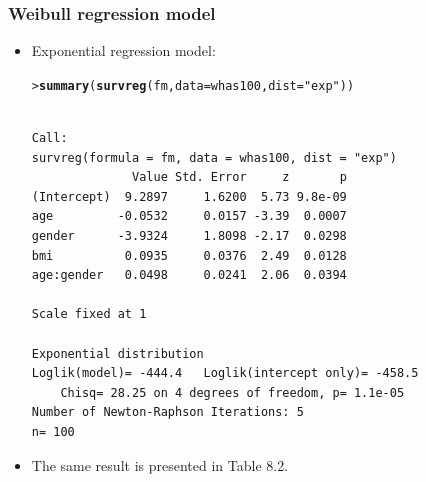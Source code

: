\documentclass[10pt]{beamer}\usepackage[]{graphicx}\usepackage[]{color}
\makeatletter
\newcommand{\hlstr}[1]{\textcolor[rgb]{0.192,0.494,0.8}{#1}}%
\newcommand{\hlstd}[1]{\textcolor[rgb]{0.345,0.345,0.345}{#1}}%
\newcommand{\hlkwc}[1]{\textcolor[rgb]{0.333,0.667,0.333}{#1}}%
\newcommand{\hlkwd}[1]{\textcolor[rgb]{0.737,0.353,0.396}{\textbf{#1}}}%
\newenvironment{kframe}{%
 \def\at@end@of@kframe{}%
 \ifinner\ifhmode%
  \def\at@end@of@kframe{\end{minipage}}%
  \begin{minipage}{\columnwidth}%
 \fi\fi%
 \def\FrameCommand##1{\hskip\@totalleftmargin \hskip-\fboxsep
 \colorbox{shadecolor}{##1}\hskip-\fboxsep
     \hskip-\linewidth \hskip-\@totalleftmargin \hskip\columnwidth}%
 \MakeFramed {\advance\hsize-\width
   \@totalleftmargin\z@ \linewidth\hsize
   \@setminipage}}%
 {\par\unskip\endMakeFramed%
 \at@end@of@kframe}
\newenvironment{knitrout}{}{} %
\renewenvironment{knitrout}{\setlength{\topsep}{-.2mm}}{}
\makeatother
\begin{document}
\begin{frame}[fragile]
  \frametitle{Weibull regression model}
  \begin{itemize}
  \item Exponential regression model:
\begin{knitrout}\scriptsize
{}\color{fgcolor}\begin{kframe}
\begin{alltt}
\hlstd{> }\hlkwd{summary}\hlstd{(}\hlkwd{survreg}\hlstd{(fm,} \hlkwc{data} \hlstd{= whas100,} \hlkwc{dist} \hlstd{=} \hlstr{"exp"}\hlstd{))}
\end{alltt}
\begin{verbatim}

Call:
survreg(formula = fm, data = whas100, dist = "exp")
              Value Std. Error     z       p
(Intercept)  9.2897     1.6200  5.73 9.8e-09
age         -0.0532     0.0157 -3.39  0.0007
gender      -3.9324     1.8098 -2.17  0.0298
bmi          0.0935     0.0376  2.49  0.0128
age:gender   0.0498     0.0241  2.06  0.0394

Scale fixed at 1 

Exponential distribution
Loglik(model)= -444.4   Loglik(intercept only)= -458.5
	Chisq= 28.25 on 4 degrees of freedom, p= 1.1e-05 
Number of Newton-Raphson Iterations: 5 
n= 100 
\end{verbatim}
\end{kframe}
\end{knitrout}
\item The same result is presented in Table 8.2.
\end{itemize}
\end{frame}
\end{document}
